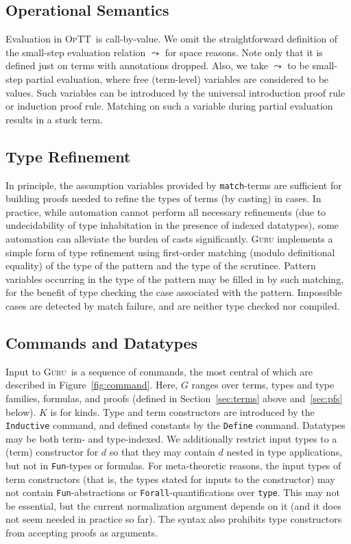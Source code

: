 \documentclass[preprint,natbib]{sigplanconf}
\newcommand{\optt}{\textsc{OpTT}}
\newcommand{\guru}[0]{\textsc{Guru}}
\begin{document}
\subsection{Operational Semantics}
\label{sec:opsem}

Evaluation in \optt\ is call-by-value.  We omit the straightforward
definition of the small-step evaluation relation $\leadsto$ for space
reasons.  Note only that it is defined just on terms with annotations
dropped.  Also, we take $\leadsto$ to be small-step partial
evaluation, where free (term-level) variables are considered to be
values.  Such variables can be introduced by the universal
introduction proof rule or induction proof rule.  Matching on such a
variable during partial evaluation results in a stuck term.

\subsection{Type Refinement}

In principle, the assumption variables provided by
\texttt{match}-terms are sufficient for building proofs needed to
refine the types of terms (by casting) in cases.  In practice, while
automation cannot perform all necessary refinements (due to
undecidability of type inhabitation in the presence of indexed
datatypes), some automation can alleviate the burden of casts
significantly.  \textsc{Guru} implements a simple form of type
refinement using first-order matching (modulo definitional equality)
of the type of the pattern and the type of the scrutinee.  Pattern
variables occurring in the type of the pattern may be filled in by such
matching, for the benefit of type checking the case associated with
the pattern.  Impossible cases are detected by match failure, and are
neither type checked nor compiled.

\subsection{Commands and Datatypes}
\label{sec:commands}

Input to \guru\ is a sequence of commands, the most central of which
are described in Figure~\ref{fig:command}.  Here, $G$ ranges over
terms, types and type families, formulas, and proofs (defined in
Section~\ref{sec:terms} above and~\ref{sec:pfs} below).  $K$ is for
kinds.  Type and term constructors are introduced by the
\texttt{Inductive} command, and defined constants by the
\texttt{Define} command.  Datatypes may be both term- and
type-indexed.  We additionally restrict input types to a (term)
constructor for $d$ so that they may contain $d$ nested in type
applications, but not in \texttt{Fun}-types or formulas.  For
meta-theoretic reasons, the input types of term constructors (that is,
the types stated for inputs to the constructor) may not contain
\texttt{Fun}-abstractions or \texttt{Forall}-quantifications over
\texttt{type}.  This may not be essential, but the current
normalization argument depends on it (and it does not seem needed in
practice so far).  The syntax also prohibits type constructors from
accepting proofs as arguments.
\end{document}
